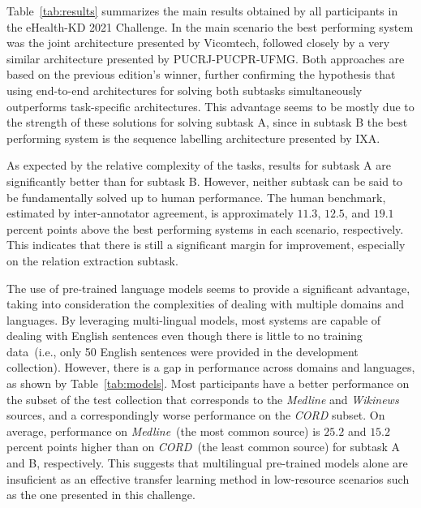 \documentclass[a4paper,11pt,twocolumn,twoside]{article}
\begin{document}
Table~\ref{tab:results} summarizes the main results obtained by all participants in the eHealth-KD 2021 Challenge.
In the main scenario the best performing system was the joint architecture presented by Vicomtech, followed closely by a very similar architecture presented by PUCRJ-PUCPR-UFMG.
Both approaches are based on the previous edition's winner, further confirming the hypothesis that using end-to-end architectures for solving both subtasks simultaneously outperforms task-specific architectures.
This advantage seems to be mostly due to the strength of these solutions for solving subtask A, since in subtask B the best performing system is the sequence labelling architecture presented by IXA.

As expected by the relative complexity of the tasks, results for subtask A are significantly better than for subtask B.
However, neither subtask can be said to be fundamentally solved up to human performance.
The human benchmark, estimated by inter-annotator agreement, is approximately $11.3$,
$12.5$, and $19.1$ percent points above the best performing systems in each scenario, respectively.
This indicates that there is still a significant margin for improvement, especially on the relation extraction subtask.

The use of pre-trained language models seems to provide a significant advantage, taking into consideration the complexities of dealing with multiple domains and languages.
By leveraging multi-lingual models, most systems are capable of dealing with English sentences even though there is little to no training data~(i.e., only 50 English sentences were provided in the development collection).
However, there is a gap in performance across domains and languages, as shown by Table~\ref{tab:models}.
Most participants have a better performance on the subset of the test collection that corresponds to the \textit{Medline} and \textit{Wikinews} sources, and a correspondingly worse performance on the \textit{CORD} subset.
On average, performance on \textit{Medline}~(the most common source) is $25.2$ and $15.2$ percent points higher than on \textit{CORD}~(the least common source) for subtask A and B, respectively.
This suggests that multilingual pre-trained models alone are insuficient as an effective transfer learning method in low-resource scenarios such as the one presented in this challenge.
\end{document}
